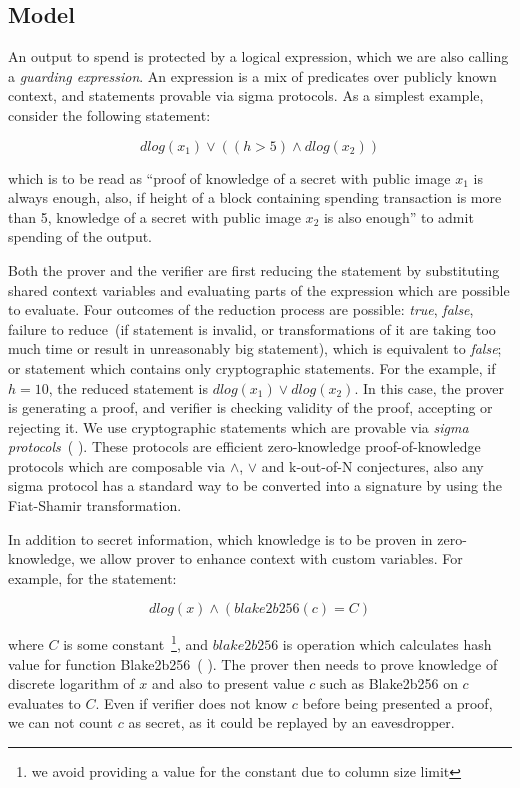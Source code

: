 \documentclass[11pt]{article}
\newcommand{\authnote}[2]{\marginpar{\parbox{\marginparwidth}{\tiny %
  \textsf{#1 {\textcolor{blue}{notes: #2}}}}}%
  \textcolor{blue}{\textbf{\dag}}}
\newcommand{\authnote}[2]{
  \textsf{#1 \textcolor{blue}{: #2}}}
\newcommand{\authnote}[2]{}
\newcommand{\knote}[1]{{\authnote{\textcolor{green}{kushti notes}}{#1}}}
\begin{document}
\subsection{Model}

An output to spend is protected by a logical expression, which we are also calling a {\em guarding expression}. An expression is a mix of predicates over publicly known context, and statements provable via sigma protocols. As a simplest example, consider the following statement:

\begin{equation}
\label{eq:example1}
dlog(x_1) \lor ((h > 5) \land dlog(x_2))
\end{equation}

which is to be read as ``proof of knowledge of a secret with public image $x_1$ is always enough, also, if height of a block containing spending transaction is more than 5, knowledge of a secret with public image $x_2$ is also enough'' to admit spending of the output.

Both the prover and the verifier are first reducing the statement by substituting shared context variables and evaluating parts of the expression which are possible to evaluate. Four outcomes of the reduction process are possible: {\em true}, {\em false}, failure to reduce~(if statement is invalid, or transformations of it are taking too much time or result in unreasonably big statement), which is equivalent to {\em false}; or statement which contains only cryptographic statements. For the example, if $h = 10$, the reduced statement is $dlog(x_1) \lor dlog(x_2)$. In this case, the prover is generating a proof, and verifier is checking validity of the proof, accepting or rejecting it. We use cryptographic statements which are provable via {\em sigma protocols}~(\knote{links}). These protocols are efficient zero-knowledge \knote{special honest verifier ZK actually} proof-of-knowledge protocols which are composable via $\land$, $\lor$ and k-out-of-N conjectures, also any sigma protocol has a standard way to be converted into a signature by using the Fiat-Shamir transformation. 

In addition to secret information, which knowledge is to be proven in zero-knowledge, we allow prover to enhance context with custom variables. For example, for the statement:

$$dlog(x) \land (blake2b256(c) = C)$$

where $C$ is some constant~\footnote{we avoid providing a value for the constant due to column size limit}, and $blake2b256$ is operation which calculates hash value for function Blake2b256~(\knote{link}). The prover then needs to prove knowledge of discrete logarithm of $x$ and also to present value $c$ such as Blake2b256 on $c$ evaluates to $C$. Even if verifier does not know $c$ before being presented a proof, we can not count $c$ as secret, as it could be replayed by an eavesdropper.
\end{document}
